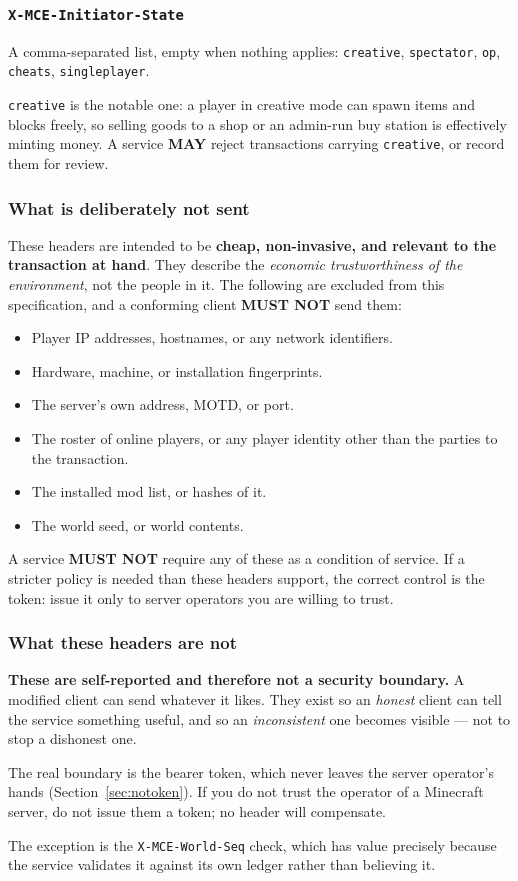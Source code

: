 \documentclass[11pt,a4paper]{article}
\newcommand{\code}[1]{\texttt{\small #1}}
\newcommand{\opt}{\textbf{MAY}}
\newcommand{\keybox}[2]{%
  \par\vspace{0.5em}\noindent
  \colorbox{#1}{%
    \begin{minipage}{\dimexpr\linewidth-2\fboxsep\relax}
    \vspace{0.35em}\small #2\vspace{0.35em}
    \end{minipage}}%
  \par\vspace{0.5em}}
\newcommand{\warn}[1]{\keybox{omceWarnWash}{#1}}
\begin{document}
\subsubsection*{\code{X-MCE-Initiator-State}}

A comma-separated list, empty when nothing applies: \code{creative}, \code{spectator}, \code{op},
\code{cheats}, \code{singleplayer}.

\code{creative} is the notable one: a player in creative mode can spawn items and blocks freely, so
selling goods to a shop or an admin-run buy station is effectively minting money. A service \opt{}
reject transactions carrying \code{creative}, or record them for review.

\subsubsection*{What is deliberately not sent}

These headers are intended to be \textbf{cheap, non-invasive, and relevant to the transaction at
hand}. They describe the \emph{economic trustworthiness of the environment}, not the people in it.
The following are excluded from this specification, and a conforming client \textbf{MUST NOT} send
them:

\begin{itemize}
\item Player IP addresses, hostnames, or any network identifiers.
\item Hardware, machine, or installation fingerprints.
\item The server's own address, MOTD, or port.
\item The roster of online players, or any player identity other than the parties to the
      transaction.
\item The installed mod list, or hashes of it.
\item The world seed, or world contents.
\end{itemize}

A service \textbf{MUST NOT} require any of these as a condition of service. If a stricter policy is
needed than these headers support, the correct control is the token: issue it only to server
operators you are willing to trust.

\subsubsection*{What these headers are not}

\warn{\textbf{These are self-reported and therefore not a security boundary.} A modified client can
send whatever it likes. They exist so an \emph{honest} client can tell the service something useful,
and so an \emph{inconsistent} one becomes visible --- not to stop a dishonest one.

The real boundary is the bearer token, which never leaves the server operator's hands
(Section~\ref{sec:notoken}). If you do not trust the operator of a Minecraft server, do not issue
them a token; no header will compensate.

The exception is the \code{X-MCE-World-Seq} check, which has value precisely because the service
validates it against its own ledger rather than believing it.}
\end{document}
